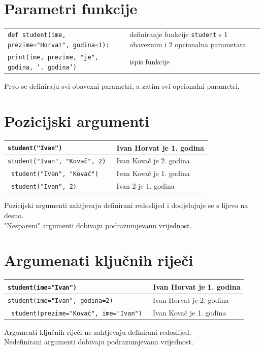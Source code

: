 \documentclass[10pt]{article}
\begin{document}
    \section*{\color{NavyBlue} Parametri funkcije}
    \begin{tabular}{|>{\tt}p{9.00cm}|>{}p{15.50cm}|}
        \hline
        def student(ime, prezime="Horvat", godina=1):                           & definiranje funkcije \texttt{student} s 1 obaveznim i 2 opcionalna parametara \\
        \hspace{5mm}print(ime, prezime, "je", godina, '. godina')               & ispis funkcije \\ \hline
    \end{tabular}
    \begin{center}
        \footnotesize
        Prvo se definiraju svi obavezni parametri, a zatim svi opcionalni parametri.
    \end{center}

    \section*{\color{NavyBlue} Pozicijski argumenti}
    \begin{tabular}{|>{\tt}p{9.00cm}|>{}p{15.50cm}|}
        \hline
        student("Ivan")               & Ivan Horvat je 1. godina \\ \hline
        student("Ivan", "Kovač", 2)   & Ivan Kovač je 2. godina \\ \hline
        student("Ivan", "Kovač")      & Ivan Kovač je 1. godina \\ \hline
        student("Ivan", 2)            & Ivan 2 je 1. godina \\ \hline
    \end{tabular}
    \begin{center}
        \footnotesize
        Pozicijski argumenti zahtjevaju definirani redoslijed i dodjelujuje se s lijevo na desno. \\
        "Nespareni" argumenti dobivaju podrazumjevanu vrijednost.
    \end{center}

    \section*{\color{NavyBlue} Argumenati ključnih riječi}
    \begin{tabular}{|>{\tt}p{9.00cm}|>{}p{15.50cm}|}
        \hline
        student(ime="Ivan")                         & Ivan Horvat je 1. godina \\ \hline
        student(ime="Ivan", godina=2)               & Ivan Horvat je 2. godina \\ \hline
        student(prezime="Kovač", ime="Ivan")        & Ivan Kovač je 1. godina \\ \hline
    \end{tabular}
    \begin{center}
        \footnotesize
        Argumenti ključnih riječi ne zahtjevaju definirani redoslijed. \\
        Nedefinirani argumenti dobivaju podrazumjevanu vrijednost.
    \end{center}
\end{document}
